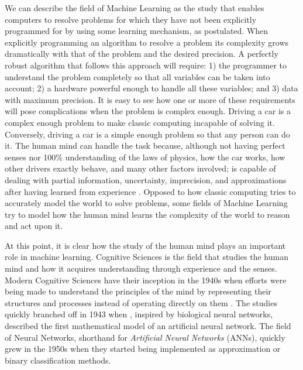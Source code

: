 We can describe the field of Machine Learning as the study that enables computers to resolve problems for which they have not been explicitly programmed for by using some learning mechanism, as \citet{Samuel1959} postulated.
When explicitly programming an algorithm to resolve a problem its complexity grows dramatically with that of the problem and the desired precision.
A perfectly robust algorithm that follows this approach will require: 1) the programmer to understand the problem completely so that all variables can be taken into account; 2) a hardware powerful enough to handle all these variables; and 3) data with maximum precision.
It is easy to see how one or more of these requirements will pose complications when the problem is complex enough.
Driving a car is a complex enough problem to make classic computing incapable of solving it.
Conversely, driving a car is a simple enough problem so that any person can do it.
The human mind can handle the task because, although not having perfect senses nor 100\% understanding of the laws of physics, how the car works, how other drivers exactly behave, and many other factors involved; is capable of dealing with partial information, uncertainty, imprecision, and approximations after having learned from experience \cite{Zadeh1994}.
Opposed to how classic computing tries to accurately model the world to solve problems, some fields of Machine Learning try to model how the human mind learns the complexity of the world to reason and act upon it.

At this point, it is clear how the study of the human mind plays an important role in machine learning.
Cognitive Sciences is the field that studies the human mind and how it acquires understanding through experience and the senses.
Modern Cognitive Sciences have their inception in the 1940s when efforts were being made to understand the principles of the mind by representing their structures and processes instead of operating directly on them \cite{Thagard2008}.
The studies quickly branched off in 1943 when \citet{McCulloch1943}, inspired by biological neural networks, described the first mathematical model of an artificial neural network.
The field of Neural Networks, shorthand for \emph{Artificial Neural Networks} (ANNs), quickly grew in the 1950s when they started being implemented \cite{Farley1954,Rosenblatt1958} as approximation or binary classification methods.


